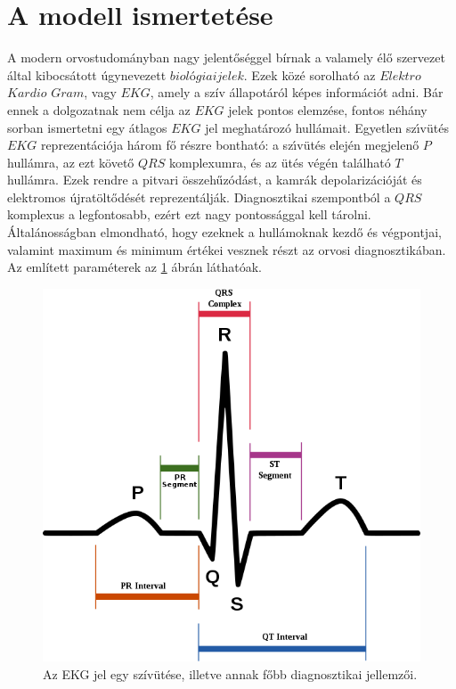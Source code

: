 \documentclass[oneside,titlepage,12pt,a4paper]{report}
\begin{document}
\section{A modell ismertetése}
A modern orvostudományban nagy jelentőséggel bírnak 
a valamely élő szervezet által kibocsátott úgynevezett $biológiai jelek$. Ezek k\"oz\'e sorolható az $Elektro$ $Kardio$ $Gram$, vagy $EKG$,
amely a szív állapotáról képes információt adni. B\'ar ennek a dolgozatnak nem c\'elja az $EKG$ jelek pontos elemz\'ese, fontos n\'eh\'any sorban ismertetni egy \'atlagos $EKG$ jel meghat\'aroz\'o hull\'amait. Egyetlen sz\'\i v\"ut\'es  $EKG$ reprezent\'aci\'oja h\'arom f\H o r\'eszre bonthat\'o: a sz\'\i v\"ut\'es elej\'en megjelen\H o $P$ hull\'amra, az ezt k\"ovet\H o $QRS$ komplexumra, \'es az \"ut\'es v\'eg\'en tal\'alhat\'o $T$ hull\'amra. Ezek rendre a pitvari összehűzódást, a kamrák depolarizációját és elektromos újratöltődését reprezentálják. Diagnosztikai szempontb\'ol a $QRS$ komplexus a legfontosabb, ezért ezt nagy pontossággal kell tárolni. Általánosságban elmondható, hogy ezeknek a hullámoknak kezd\H o \'es v\'egpontjai, valamint maximum \'es minimum \'ert\'ekei vesznek részt az orvosi diagnosztikában. Az említett paraméterek az \ref{fig:ekg} ábrán láthatóak.

\begin{figure}[htb!]
\begin{center}
   \includegraphics[scale=0.37]{./Abrak/Egyeb/ecg_wiki.png}
   \caption{Az EKG jel egy szívütése, illetve annak főbb diagnosztikai jellemzői.}
		\label{fig:ekg}
\end{center}
\end{figure}
 
\end{document}
